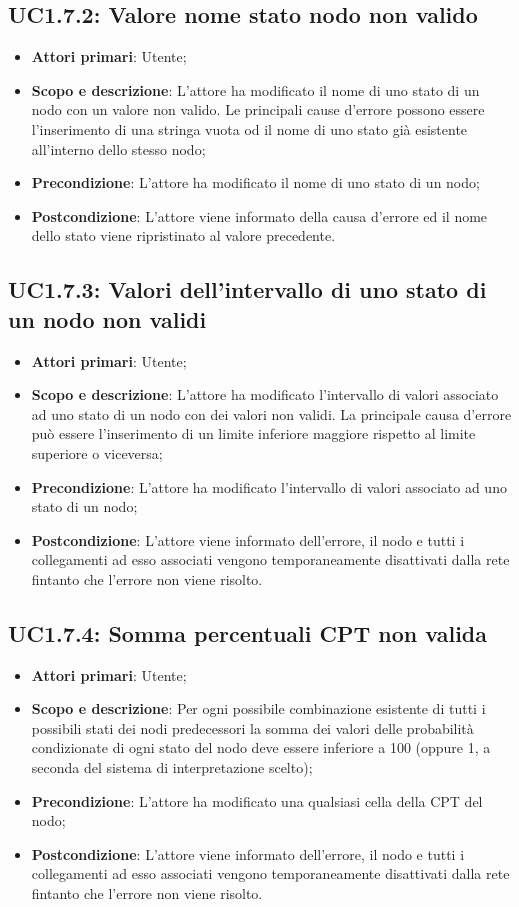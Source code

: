 \subsection{UC1.7.2: Valore nome stato nodo non valido} 
\hypertarget{UC1.7.2}{} 
\begin{itemize} 
	\item{\textbf{Attori primari}: Utente;} 
	\item{\textbf{Scopo e descrizione}: L'attore ha modificato il nome di uno stato di un nodo con un valore non valido. Le principali cause d'errore possono essere l'inserimento di una stringa vuota od il nome di uno stato già esistente all'interno dello stesso nodo;} 
	\item{\textbf{Precondizione}: L'attore ha modificato il nome di uno stato di un nodo;} 
	\item{\textbf{Postcondizione}: L'attore viene informato della causa d'errore ed il nome dello stato viene ripristinato al valore precedente.} 
\end{itemize} 
\subsection{UC1.7.3: Valori dell'intervallo di uno stato di un nodo non validi} 
\hypertarget{UC1.7.3}{} 
\begin{itemize} 
	\item{\textbf{Attori primari}: Utente;} 
	\item{\textbf{Scopo e descrizione}: L'attore ha modificato l'intervallo di valori associato ad uno stato di un nodo con dei valori non validi. La principale causa d'errore può essere l'inserimento di un limite inferiore maggiore rispetto al limite superiore o viceversa;} 
	\item{\textbf{Precondizione}: L'attore ha modificato l'intervallo di valori associato ad uno stato di un nodo;} 
	\item{\textbf{Postcondizione}: L'attore viene informato dell'errore, il nodo e tutti i collegamenti ad esso associati vengono temporaneamente disattivati dalla rete fintanto che l'errore non viene risolto.} 
\end{itemize} 
\subsection{UC1.7.4: Somma percentuali CPT non valida} 
\hypertarget{UC1.7.4}{} 
\begin{itemize} 
	\item{\textbf{Attori primari}: Utente;} 
	\item{\textbf{Scopo e descrizione}: Per ogni possibile combinazione esistente di tutti i possibili stati dei nodi predecessori la somma dei valori delle probabilità condizionate di ogni stato del nodo deve essere inferiore a 100 (oppure 1, a seconda del sistema di interpretazione scelto);} 
	\item{\textbf{Precondizione}: L'attore ha modificato una qualsiasi cella della CPT del nodo;} 
	\item{\textbf{Postcondizione}: L'attore viene informato dell'errore, il nodo e tutti i collegamenti ad esso associati vengono temporaneamente disattivati dalla rete fintanto che l'errore non viene risolto.}
\end{itemize} 
